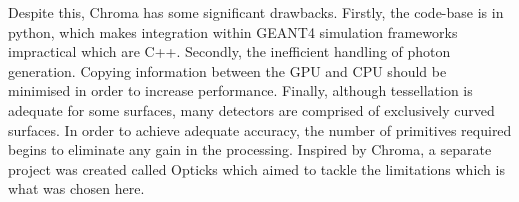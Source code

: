 \par
Despite this, Chroma has some significant drawbacks.
Firstly, the code-base is in python, which makes integration within GEANT4 simulation frameworks impractical which are C++.
Secondly, the inefficient handling of photon generation.
Copying information between the GPU and CPU should be minimised in order to increase performance.
Finally, although tessellation is adequate for some surfaces, many detectors are comprised of exclusively curved surfaces.
In order to achieve adequate accuracy, the number of primitives required begins to eliminate any gain in the processing.
Inspired by Chroma, a separate project was created called Opticks which aimed to tackle the limitations \cite{Opticks_Paper_2017_ref,Opticks_CHEP_2019_ref,Opticks_CHEP_2021_ref} which is what was chosen here.

